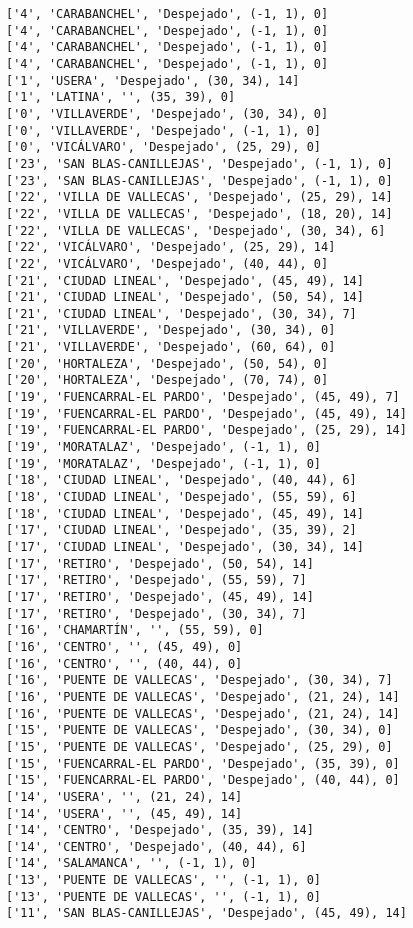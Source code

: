 \documentclass[11pt]{article}
\begin{document}
\begin{Verbatim}[commandchars=\\\{\}]
['4', 'CARABANCHEL', 'Despejado', (-1, 1), 0]
['4', 'CARABANCHEL', 'Despejado', (-1, 1), 0]
['4', 'CARABANCHEL', 'Despejado', (-1, 1), 0]
['4', 'CARABANCHEL', 'Despejado', (-1, 1), 0]
['1', 'USERA', 'Despejado', (30, 34), 14]
['1', 'LATINA', '', (35, 39), 0]
['0', 'VILLAVERDE', 'Despejado', (30, 34), 0]
['0', 'VILLAVERDE', 'Despejado', (-1, 1), 0]
['0', 'VICÁLVARO', 'Despejado', (25, 29), 0]
['23', 'SAN BLAS-CANILLEJAS', 'Despejado', (-1, 1), 0]
['23', 'SAN BLAS-CANILLEJAS', 'Despejado', (-1, 1), 0]
['22', 'VILLA DE VALLECAS', 'Despejado', (25, 29), 14]
['22', 'VILLA DE VALLECAS', 'Despejado', (18, 20), 14]
['22', 'VILLA DE VALLECAS', 'Despejado', (30, 34), 6]
['22', 'VICÁLVARO', 'Despejado', (25, 29), 14]
['22', 'VICÁLVARO', 'Despejado', (40, 44), 0]
['21', 'CIUDAD LINEAL', 'Despejado', (45, 49), 14]
['21', 'CIUDAD LINEAL', 'Despejado', (50, 54), 14]
['21', 'CIUDAD LINEAL', 'Despejado', (30, 34), 7]
['21', 'VILLAVERDE', 'Despejado', (30, 34), 0]
['21', 'VILLAVERDE', 'Despejado', (60, 64), 0]
['20', 'HORTALEZA', 'Despejado', (50, 54), 0]
['20', 'HORTALEZA', 'Despejado', (70, 74), 0]
['19', 'FUENCARRAL-EL PARDO', 'Despejado', (45, 49), 7]
['19', 'FUENCARRAL-EL PARDO', 'Despejado', (45, 49), 14]
['19', 'FUENCARRAL-EL PARDO', 'Despejado', (25, 29), 14]
['19', 'MORATALAZ', 'Despejado', (-1, 1), 0]
['19', 'MORATALAZ', 'Despejado', (-1, 1), 0]
['18', 'CIUDAD LINEAL', 'Despejado', (40, 44), 6]
['18', 'CIUDAD LINEAL', 'Despejado', (55, 59), 6]
['18', 'CIUDAD LINEAL', 'Despejado', (45, 49), 14]
['17', 'CIUDAD LINEAL', 'Despejado', (35, 39), 2]
['17', 'CIUDAD LINEAL', 'Despejado', (30, 34), 14]
['17', 'RETIRO', 'Despejado', (50, 54), 14]
['17', 'RETIRO', 'Despejado', (55, 59), 7]
['17', 'RETIRO', 'Despejado', (45, 49), 14]
['17', 'RETIRO', 'Despejado', (30, 34), 7]
['16', 'CHAMARTÍN', '', (55, 59), 0]
['16', 'CENTRO', '', (45, 49), 0]
['16', 'CENTRO', '', (40, 44), 0]
['16', 'PUENTE DE VALLECAS', 'Despejado', (30, 34), 7]
['16', 'PUENTE DE VALLECAS', 'Despejado', (21, 24), 14]
['16', 'PUENTE DE VALLECAS', 'Despejado', (21, 24), 14]
['15', 'PUENTE DE VALLECAS', 'Despejado', (30, 34), 0]
['15', 'PUENTE DE VALLECAS', 'Despejado', (25, 29), 0]
['15', 'FUENCARRAL-EL PARDO', 'Despejado', (35, 39), 0]
['15', 'FUENCARRAL-EL PARDO', 'Despejado', (40, 44), 0]
['14', 'USERA', '', (21, 24), 14]
['14', 'USERA', '', (45, 49), 14]
['14', 'CENTRO', 'Despejado', (35, 39), 14]
['14', 'CENTRO', 'Despejado', (40, 44), 6]
['14', 'SALAMANCA', '', (-1, 1), 0]
['13', 'PUENTE DE VALLECAS', '', (-1, 1), 0]
['13', 'PUENTE DE VALLECAS', '', (-1, 1), 0]
['11', 'SAN BLAS-CANILLEJAS', 'Despejado', (45, 49), 14]

\end{Verbatim}
\end{document}
